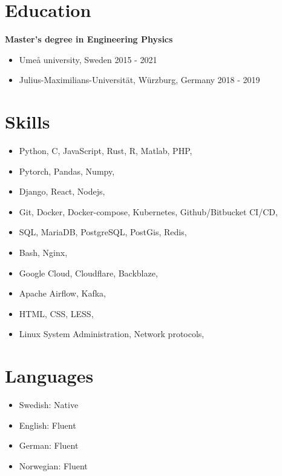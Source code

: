 \documentclass[11pt, a4paper]{article}
\begin{document}
\section*{Education}
\textbf{Master's degree in Engineering Physics}
\begin{itemize}[noitemsep]
    \item Umeå university, Sweden \hfill 2015 - 2021
    \item Julius-Maximilians-Universität, Würzburg, Germany \hfill 2018 - 2019
\end{itemize}

\section*{Skills}
\begin{itemize}[noitemsep]
    \item Python, C, JavaScript, Rust, R, Matlab, PHP, 
    \item Pytorch, Pandas, Numpy,
    \item Django, React, Nodejs, 
    \item Git, Docker, Docker-compose, Kubernetes, Github/Bitbucket CI/CD,
    \item SQL, MariaDB, PostgreSQL, PostGis, Redis,
    \item Bash, Nginx,
    \item Google Cloud, Cloudflare, Backblaze,
    \item Apache Airflow, Kafka,
    \item HTML, CSS, LESS, 
    \item Linux System Administration, Network protocols,
\end{itemize}


\section*{Languages}
\begin{itemize}[noitemsep]
    \item Swedish: Native
    \item English: Fluent
    \item German: Fluent
    \item Norwegian: Fluent
\end{itemize}
\end{document}
